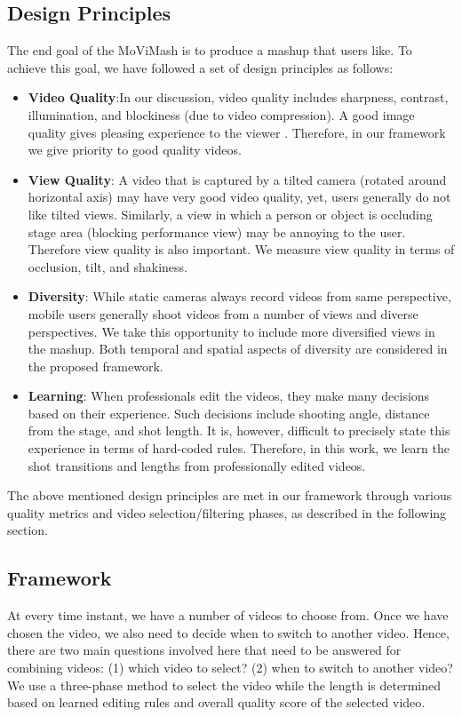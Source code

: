 \documentclass{new}
\begin{document}
\subsection{Design Principles}
The end goal of the MoViMash is to produce a mashup that users
like. To achieve this goal, we have followed a set of design principles
as follows:
\begin{itemize}
  \item \textbf{Video Quality}:In our discussion, video quality includes
sharpness, contrast, illumination, and blockiness (due to video compression). A good image quality gives pleasing experience to the viewer \cite{rfc10}. Therefore, in our framework we give priority to good quality videos.
  \item \textbf{View Quality}: A video that is captured by a tilted camera (rotated around horizontal axis) may have very good video quality, yet, users generally do not like tilted views. Similarly, a view in which a person or object is occluding stage area (blocking performance view) may be annoying to the user. Therefore view quality is also important. We measure view quality in terms of occlusion, tilt, and shakiness.
  \item \textbf{Diversity}: While static cameras always record videos from
same perspective, mobile users generally shoot videos from
a number of views and diverse perspectives. We take this
opportunity to include more diversified views in the mashup.
Both temporal and spatial aspects of diversity are considered
in the proposed framework.
\item \textbf{Learning}: When professionals edit the videos, they make
many decisions based on their experience. Such decisions
include shooting angle, distance from the stage, and shot
length. It is, however, difficult to precisely state this experience
in terms of hard-coded rules. Therefore, in this work,
we learn the shot transitions and lengths from professionally
edited videos.
\end{itemize}

The above mentioned design principles are met in our framework
through various quality metrics and video selection/filtering phases,
as described in the following section.

\subsection{Framework}
At every time instant, we have a number of videos to choose from. Once we have chosen the video, we also need to decide when to switch to another video. Hence, there are two main questions involved here that need to be answered for combining videos: (1) which video to select? (2) when to switch to another video? We use a three-phase method to select the video while the length is determined based on learned editing rules and overall quality score of the selected video.
\end{document}
